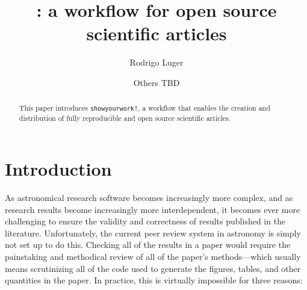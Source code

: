 \documentclass[modern]{aastex631}
\begin{document}
\title{\showyourwork: a workflow for open source scientific articles}

\author[0000-0002-0296-3826]{Rodrigo Luger}
\author{Others TBD}

\begin{abstract}
    This paper introduces \texttt{showyourwork!}, a workflow that enables the creation and distribution of fully reproducible and open source scientific articles.
\end{abstract}

\section{Introduction}
\label{sec:intro}
As astronomical research software becomes increasingly more complex, and as research results become increasingly more interdependent, it becomes ever more challenging to ensure the validity and correctness of results published in the literature. 
Unfortunately, the current peer review system in astronomy is simply not set up to do this.
Checking all of the results in a paper would require the painstaking and methodical review of all of the paper's methods---which usually means scrutinizing all of the code used to generate the figures, tables, and other quantities in the paper. 
In practice, this is virtually impossible for three reasons:
\end{document}
